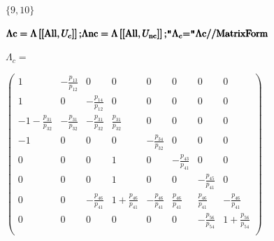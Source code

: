 \documentclass{article}
\newcommand{\unicode}[1]{{}}
\begin{document}
\begin{doublespace}
\noindent\(\{9,10\}\)
\end{doublespace}

\begin{doublespace}
\noindent\(\pmb{\text{$\Lambda $c}=\Lambda \left[\left[\text{All},U_c\right]\right];}\\
\pmb{\text{$\Lambda $nc}=\Lambda \left[\left[\text{All},U_{\text{nc}}\right]\right];}\\
\pmb{\texttt{"}\Lambda _c\text{=$\texttt{"}$}}\\
\pmb{\text{$\Lambda $c}\text{//}\text{MatrixForm}}\)
\end{doublespace}

\begin{doublespace}
\noindent\(\Lambda _c=\)
\end{doublespace}

\begin{doublespace}
\noindent\(\left(
\begin{array}{cccccccc}
 1 & -\frac{p_{1\unicode{f3d5}3}}{p_{1\unicode{f3d5}2}} & 0 & 0 & 0 & 0 & 0 & 0 \\
 1 & 0 & -\frac{p_{1\unicode{f3d5}4}}{p_{1\unicode{f3d5}2}} & 0 & 0 & 0 & 0 & 0 \\
 -1-\frac{p_{3\unicode{f3d5}1}}{p_{3\unicode{f3d5}2}} & -\frac{p_{3\unicode{f3d5}1}}{p_{3\unicode{f3d5}2}} & -\frac{p_{3\unicode{f3d5}1}}{p_{3\unicode{f3d5}2}}
& \frac{p_{3\unicode{f3d5}1}}{p_{3\unicode{f3d5}2}} & 0 & 0 & 0 & 0 \\
 -1 & 0 & 0 & 0 & -\frac{p_{3\unicode{f3d5}4}}{p_{3\unicode{f3d5}2}} & 0 & 0 & 0 \\
 0 & 0 & 0 & 1 & 0 & -\frac{p_{4\unicode{f3d5}3}}{p_{4\unicode{f3d5}1}} & 0 & 0 \\
 0 & 0 & 0 & 1 & 0 & 0 & -\frac{p_{4\unicode{f3d5}5}}{p_{4\unicode{f3d5}1}} & 0 \\
 0 & 0 & -\frac{p_{4\unicode{f3d5}6}}{p_{4\unicode{f3d5}1}} & 1+\frac{p_{4\unicode{f3d5}6}}{p_{4\unicode{f3d5}1}} & -\frac{p_{4\unicode{f3d5}6}}{p_{4\unicode{f3d5}1}}
& \frac{p_{4\unicode{f3d5}6}}{p_{4\unicode{f3d5}1}} & \frac{p_{4\unicode{f3d5}6}}{p_{4\unicode{f3d5}1}} & -\frac{p_{4\unicode{f3d5}6}}{p_{4\unicode{f3d5}1}}
\\
 0 & 0 & 0 & 0 & 0 & 0 & -\frac{p_{5\unicode{f3d5}6}}{p_{5\unicode{f3d5}4}} & 1+\frac{p_{5\unicode{f3d5}6}}{p_{5\unicode{f3d5}4}} \\
\end{array}
\right)\)
\end{doublespace}
\end{document}
